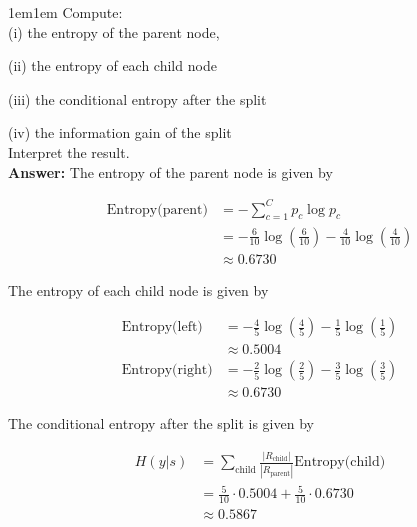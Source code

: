 \documentclass[11pt]{article}
\begin{document}
\begin{adjustwidth}{1em}{1em}
        Compute: \\ 

        (i) the entropy of the parent node, 

        (ii) the entropy of each child node

        (iii) the conditional entropy after the split

        (iv) the information gain of the split \\ 

        Interpret the result. \\ 

        \textbf{Answer:} The entropy of the parent node is given by 

        \begin{align*}
            \text{Entropy(parent)} &= -\sum_{c = 1}^C p_c \log p_c \\ 
                                   &= -\frac{6}{10} \log\left( \frac{6}{10}\right) 
                                   - \frac{4}{10} \log \left(\frac{4}{10}\right) \\ 
                                   &\approx 0.6730
        \end{align*}

        The entropy of each child node is given by

        \begin{align*}
            \text{Entropy(left)} &= -\frac{4}{5}\log \left(\frac{4}{5}\right) - 
                \frac{1}{5} \log \left(\frac{1}{5}\right) \\ 
                                 &\approx 0.5004
                                 \\ 
            \text{Entropy(right)} &= -\frac{2}{5}\log \left(\frac{2}{5}\right) - \frac{3}{5}\log  
                \left(\frac{3}{5}\right) \\ 
                                  &\approx 0.6730
        \end{align*}

        The conditional entropy after the split is given by

        \begin{align*}
            H(y | s) &= \sum_{\text{child}} \frac{|R_\text{child}|}{|R_\text{parent}|}
            \text{Entropy(child)} \\ 
                     &= \frac{5}{10} \cdot 0.5004 + \frac{5}{10} \cdot 0.6730 \\ 
                     &\approx 0.5867
        \end{align*}


\end{adjustwidth}
\end{document}
